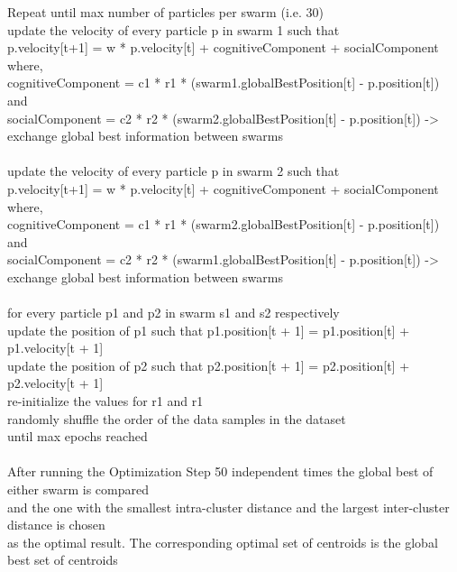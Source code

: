 \begin{flushleft}
            Repeat until max number of particles per swarm (i.e. 30) \\
                update the velocity of every particle p in swarm 1 such that \\
                p.velocity[t+1] = w * p.velocity[t] + cognitiveComponent + socialComponent where, \\
                cognitiveComponent =  c1 * r1 * (swarm1.globalBestPosition[t] - p.position[t]) and \\
                socialComponent = c2 * r2 * (swarm2.globalBestPosition[t] - p.position[t]) -> exchange global best information between swarms \\
                \\
                update the velocity of every particle p in swarm 2 such that \\
                p.velocity[t+1] = w * p.velocity[t] + cognitiveComponent + socialComponent where, \\
                cognitiveComponent =  c1 * r1 * (swarm2.globalBestPosition[t] - p.position[t]) and \\
                socialComponent = c2 * r2 * (swarm1.globalBestPosition[t] - p.position[t]) -> exchange global best information between swarms \\
                \\
                for every particle p1 and p2 in swarm s1 and s2 respectively \\
                    update the position of p1 such that p1.position[t + 1] = p1.position[t] + p1.velocity[t + 1] \\
                    update the position of p2 such that p2.position[t + 1] = p2.position[t] + p2.velocity[t + 1] \\
            re-initialize the values for r1 and r1 \\
            randomly shuffle the order of the data samples in the dataset \\
        until max epochs reached \\
        \\ 
        After running the Optimization Step 50 independent times the global best of either swarm is compared \\
        and the one with the smallest intra-cluster distance and the largest inter-cluster distance is chosen \\
        as the optimal result. The corresponding optimal set of centroids is the global best set of centroids \\

\end{flushleft}
